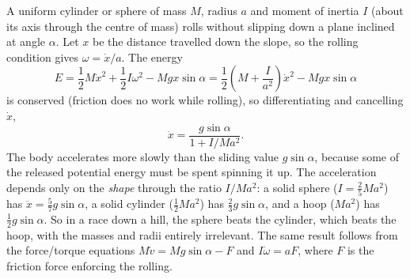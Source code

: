 \begin{center}
\end{center}

\begin{example}
	A uniform cylinder or sphere of mass $M$, radius $a$ and moment of inertia $I$ (about its axis through the centre of mass) rolls without slipping down a plane inclined at angle $\alpha$. Let $x$ be the distance travelled down the slope, so the rolling condition gives $\omega = \dot{x}/a$. The energy
	$$
	E = \frac{1}{2}M\dot{x}^2 + \frac{1}{2}I \omega^2 - Mgx \sin\alpha = \frac{1}{2}\left(M + \frac{I}{a^2}\right)\dot{x}^2 - Mg x \sin \alpha
	$$
	is conserved (friction does no work while rolling), so differentiating and cancelling $\dot{x}$,
	$$
	\ddot{x} = \frac{g \sin\alpha}{1 + I/Ma^2}.
	$$
	The body accelerates more slowly than the sliding value $g \sin\alpha$, because some of the released potential energy must be spent spinning it up. The acceleration depends only on the \emph{shape} through the ratio $I/Ma^2$: a solid sphere ($I = \frac{2}{5}Ma^2$) has $\ddot x = \frac{5}{7}g\sin\alpha$, a solid cylinder ($\frac{1}{2}Ma^2$) has $\frac{2}{3}g\sin\alpha$, and a hoop ($Ma^2$) has $\frac{1}{2}g \sin\alpha$. So in a race down a hill, the sphere beats the cylinder, which beats the hoop, with the masses and radii entirely irrelevant. The same result follows from the force/torque equations $M\dot v = Mg\sin\alpha - F$ and $I \dot\omega = aF$, where $F$ is the friction force enforcing the rolling.
\end{example}

